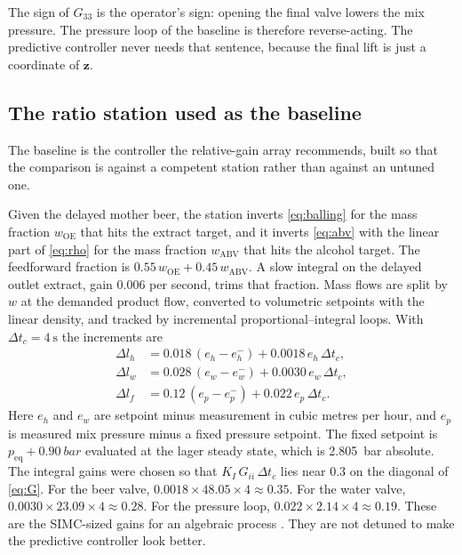 The sign of $G_{33}$ is the operator's sign: opening the final valve lowers the mix pressure. The pressure loop of the baseline is therefore reverse-acting. The predictive controller never needs that sentence, because the final lift is just a coordinate of $\mathbf{z}$.

\subsection{The ratio station used as the baseline}

The baseline is the controller the relative-gain array recommends, built so that the comparison is against a competent station rather than against an untuned one.

Given the delayed mother beer, the station inverts \eqref{eq:balling} for the mass fraction $w_{\mathrm{OE}}$ that hits the extract target, and it inverts \eqref{eq:abv} with the linear part of \eqref{eq:rho} for the mass fraction $w_{\mathrm{ABV}}$ that hits the alcohol target. The feedforward fraction is $0.55\,w_{\mathrm{OE}}+0.45\,w_{\mathrm{ABV}}$. A slow integral on the delayed outlet extract, gain $0.006$ per second, trims that fraction. Mass flows are split by $w$ at the demanded product flow, converted to volumetric setpoints with the linear density, and tracked by incremental proportional--integral loops. With $\Delta t_c=\SI{4}{\second}$ the increments are
\begin{align}
\label{eq:pi}
\Delta l_h
&=
0.018\,(e_h-e_h^{-}) + 0.0018\,e_h\,\Delta t_c,
\\
\Delta l_w
&=
0.028\,(e_w-e_w^{-}) + 0.0030\,e_w\,\Delta t_c,
\\
\Delta l_f
&=
0.12\,(e_p-e_p^{-}) + 0.022\,e_p\,\Delta t_c.
\end{align}
Here $e_h$ and $e_w$ are setpoint minus measurement in cubic metres per hour, and $e_p$ is measured mix pressure minus a fixed pressure setpoint. The fixed setpoint is $p_{\mathrm{eq}}+\SI{0.90}{bar}$ evaluated at the lager steady state, which is \SI{2.805}{bar} absolute. The integral gains were chosen so that $K_I\,G_{ii}\,\Delta t_c$ lies near $0.3$ on the diagonal of \eqref{eq:G}. For the beer valve, $0.0018\times 48.05\times 4 \approx 0.35$. For the water valve, $0.0030\times 23.09\times 4 \approx 0.28$. For the pressure loop, $0.022\times 2.14\times 4 \approx 0.19$. These are the SIMC-sized gains for an algebraic process \citep{skogestad2003,astrom2006}. They are not detuned to make the predictive controller look better.

